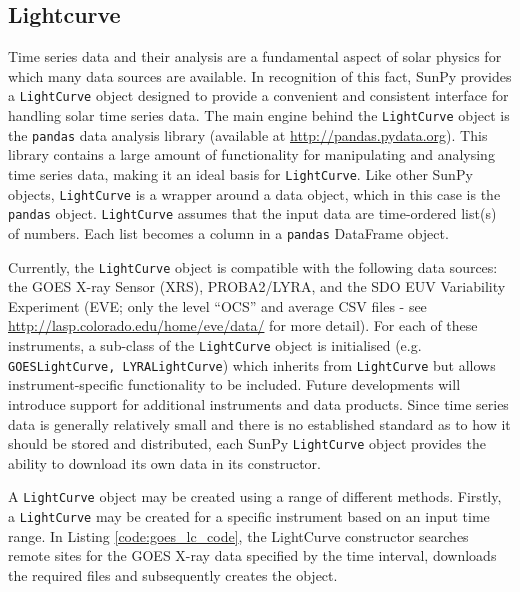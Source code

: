 \subsection{Lightcurve}\label{ssec:lightcurve}

Time series data and their analysis are a fundamental aspect of solar
physics for which many data sources are available.  In recognition of
this fact, SunPy provides a \texttt{LightCurve} object designed to
provide a convenient and consistent interface for handling solar time
series data.  The main engine behind the \texttt{LightCurve} object is
the \texttt{pandas} data analysis library (available at
\url{http://pandas.pydata.org}).  This library contains a large amount
of functionality for manipulating and analysing time series data,
making it an ideal basis for \texttt{LightCurve}.  Like other SunPy
objects, \texttt{LightCurve} is a wrapper around a data object, which
in this case is the \texttt{pandas} object.  \texttt{LightCurve}
assumes that the input data are time-ordered list(s) of numbers.  Each
list becomes a column in a \texttt{pandas} DataFrame object.

Currently, the \texttt{LightCurve} object is compatible with the
following data sources: the GOES X-ray Sensor (XRS), PROBA2/LYRA, and
the SDO EUV Variability Experiment (EVE; only the level ``OCS'' and
average CSV files - see \url{http://lasp.colorado.edu/home/eve/data/}
for more detail).  For each of these instruments, a sub-class of the
\texttt{LightCurve} object is initialised
(e.g. \texttt{GOESLightCurve, LYRALightCurve}) which inherits from
\texttt{LightCurve} but allows instrument-specific functionality to be
included.  Future developments will introduce support for additional
instruments and data products.  Since time series data is generally
relatively small and there is no established standard as to how it
should be stored and distributed, each SunPy \texttt{LightCurve}
object provides the ability to download its own data in its
constructor.


A \texttt{LightCurve} object may be created using a range of different
methods.  Firstly, a \texttt{LightCurve} may be created for a specific
instrument based on an input time range. In Listing
\ref{code:goes_lc_code}, the LightCurve constructor searches remote
sites for the GOES X-ray data specified by the time interval,
downloads the required files and subsequently creates the object.

